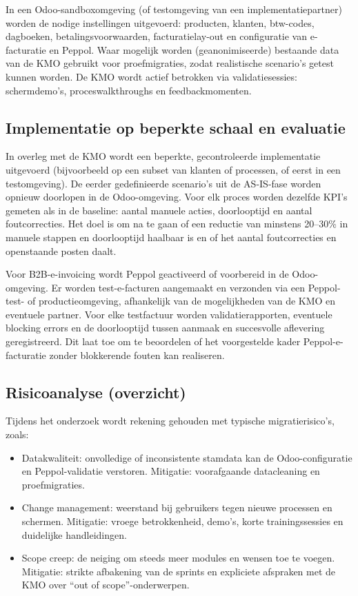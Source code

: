 In een Odoo-sandboxomgeving (of testomgeving van een implementatiepartner) worden de nodige instellingen uitgevoerd: producten, klanten, btw-codes, dagboeken, betalingsvoorwaarden, facturatielay-out en configuratie van e-facturatie en Peppol. Waar mogelijk worden (geanonimiseerde) bestaande data van de KMO gebruikt voor proefmigraties, zodat realistische scenario’s getest kunnen worden. De KMO wordt actief betrokken via validatiesessies: schermdemo’s, proceswalkthroughs en feedbackmomenten.

\subsection{Implementatie op beperkte schaal en evaluatie}

In overleg met de KMO wordt een beperkte, gecontroleerde implementatie uitgevoerd (bijvoorbeeld op een subset van klanten of processen, of eerst in een testomgeving). De eerder gedefinieerde scenario’s uit de AS-IS-fase worden opnieuw doorlopen in de Odoo-omgeving. Voor elk proces worden dezelfde KPI’s gemeten als in de baseline: aantal manuele acties, doorlooptijd en aantal foutcorrecties. Het doel is om na te gaan of een reductie van minstens 20–30\% in manuele stappen en doorlooptijd haalbaar is en of het aantal foutcorrecties en openstaande posten daalt.

Voor B2B-e-invoicing wordt Peppol geactiveerd of voorbereid in de Odoo-omgeving. Er worden test-e-facturen aangemaakt en verzonden via een Peppol-test- of productieomgeving, afhankelijk van de mogelijkheden van de KMO en eventuele partner. Voor elke testfactuur worden validatierapporten, eventuele blocking errors en de doorlooptijd tussen aanmaak en succesvolle aflevering geregistreerd. Dit laat toe om te beoordelen of het voorgestelde kader Peppol-e-facturatie zonder blokkerende fouten kan realiseren.

\subsection*{Risicoanalyse (overzicht)}

Tijdens het onderzoek wordt rekening gehouden met typische migratierisico’s, zoals:
\begin{itemize}
  \item Datakwaliteit: onvolledige of inconsistente stamdata kan de Odoo-configuratie en Peppol-validatie verstoren. Mitigatie: voorafgaande datacleaning en proefmigraties.
  \item Change management: weerstand bij gebruikers tegen nieuwe processen en schermen. Mitigatie: vroege betrokkenheid, demo’s, korte trainingssessies en duidelijke handleidingen.
  \item Scope creep: de neiging om steeds meer modules en wensen toe te voegen. Mitigatie: strikte afbakening van de sprints en expliciete afspraken met de KMO over “out of scope”-onderwerpen.
\end{itemize}


